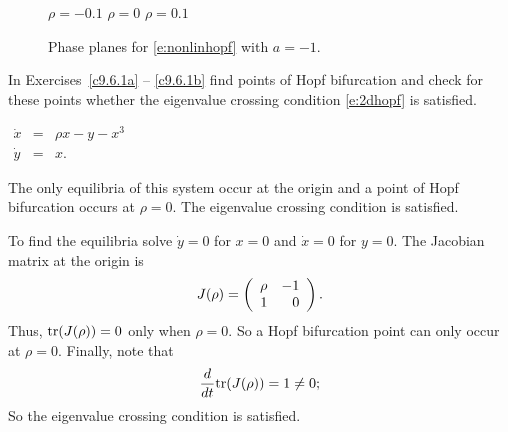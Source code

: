 \documentclass{ximera}
\begin{document}
\begin{figure}[htb]
           \centerline{%
           }
 	\vspace*{-0.2in}
	\hspace{0.3in} $\rho=-0.1$  \hspace{1.7in} $\rho=0$
		\hspace{1.8in} $\rho=0.1$ 
          \caption{Phase planes for \protect\eqref{e:nonlinhopf} with $a=-1$.}
           \label{F:nonlinhopf}
\end{figure}



\EXER

\TEXER

\noindent In Exercises~\ref{c9.6.1a} -- \ref{c9.6.1b} find points of Hopf
bifurcation and check for these points whether the eigenvalue crossing
condition \eqref{e:2dhopf} is satisfied.
\begin{exercise} \label{c9.6.1a}
$\begin{array}{rcl}
\dot{x} & = & \rho x - y -x^3 \\
\dot{y} & = & x.
\end{array}$

\begin{solution}

\ans The only equilibria of this system occur at the origin and a point of
Hopf bifurcation occurs at $\rho=0$.  The eigenvalue crossing condition is
satisfied.

\soln  To find the equilibria solve $\dot{y}=0$ for $x=0$ and $\dot{x}=0$ for
$y=0$.  The Jacobian matrix at the origin is 
\[
J(\rho) = \left(\begin{array}{rr} \rho & -1\\ 1 &0\end{array}\right).
\]
Thus, ${\rm tr}(J(\rho))=0$ only when $\rho=0$.  So a Hopf bifurcation point
can only occur at $\rho=0$.  Finally, note that 
\[
\frac{d}{dt}{\rm tr}(J(\rho)) = 1 \neq 0;
\]
So the eigenvalue crossing condition is satisfied.


\end{solution}
\end{exercise}
\end{document}
